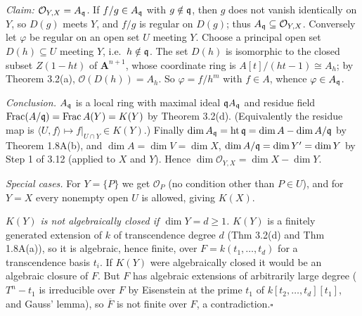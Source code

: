 \documentclass[11pt]{article}
\begin{document}
\emph{Claim: $\mathcal{O}_{Y,X}=A_\mathfrak q$.} If $f/g\in A_\mathfrak q$ with $g\notin\mathfrak q$, then $g$ does not vanish identically on $Y$, so $D(g)$ meets $Y$, and $f/g$ is regular on $D(g)$; thus $A_\mathfrak q\subseteq \mathcal{O}_{Y,X}$. Conversely let $\varphi$ be regular on an open set $U$ meeting $Y$. Choose a principal open set $D(h)\subseteq U$ meeting $Y$, i.e.\ $h\notin\mathfrak q$. The set $D(h)$ is isomorphic to the closed subset $Z(1-ht)$ of $\mathbf A^{n+1}$, whose coordinate ring is $A[t]/(ht-1)\cong A_h$; by Theorem 3.2(a), $\mathcal{O}(D(h))=A_h$. So $\varphi=f/h^m$ with $f\in A$, whence $\varphi\in A_\mathfrak q$.

\emph{Conclusion.} $A_\mathfrak q$ is a local ring with maximal ideal $\mathfrak q A_\mathfrak q$ and residue field $\operatorname{Frac}(A/\mathfrak q)=\operatorname{Frac}A(Y)=K(Y)$ by Theorem 3.2(d). (Equivalently the residue map is $\langle U,f\rangle\mapsto f|_{U\cap Y}\in K(Y)$.) Finally $\dim A_\mathfrak q=\operatorname{ht}\mathfrak q=\dim A-\dim A/\mathfrak q$ by Theorem 1.8A(b), and $\dim A=\dim V=\dim X$, $\dim A/\mathfrak q=\dim Y'=\dim Y$ by Step 1 of 3.12 (applied to $X$ and $Y$). Hence $\dim\mathcal{O}_{Y,X}=\dim X-\dim Y$.

\emph{Special cases.} For $Y=\{P\}$ we get $\mathcal{O}_{P}$ (no condition other than $P\in U$), and for $Y=X$ every nonempty open $U$ is allowed, giving $K(X)$.

\emph{$K(Y)$ is not algebraically closed if $\dim Y=d\ge1$.} $K(Y)$ is a finitely generated extension of $k$ of transcendence degree $d$ (Thm 3.2(d) and Thm 1.8A(a)), so it is algebraic, hence finite, over $F=k(t_1,\dots,t_d)$ for a transcendence basis $t_i$. If $K(Y)$ were algebraically closed it would be an algebraic closure of $F$. But $F$ has algebraic extensions of arbitrarily large degree ($T^n-t_1$ is irreducible over $F$ by Eisenstein at the prime $t_1$ of $k[t_2,\dots,t_d][t_1]$, and Gauss' lemma), so $\overline F$ is not finite over $F$, a contradiction.\hfill$\square$
\end{document}
